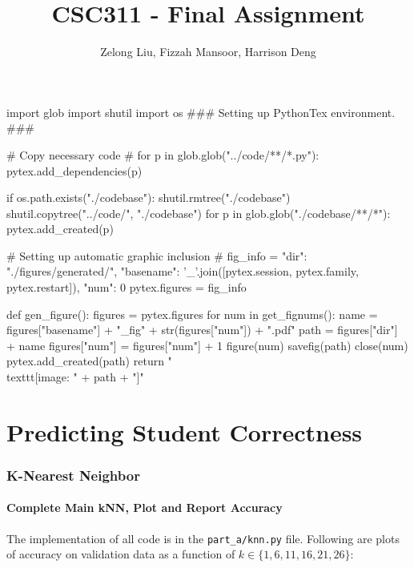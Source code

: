 \documentclass{article}
\title{CSC311 - Final Assignment}
\author{Zelong Liu, Fizzah Mansoor, Harrison Deng}
\begin{document}
    \begin{pylabcode}
        import glob
        import shutil
        import os
        ### Setting up PythonTex environment. ###

        # Copy necessary code #
        for p in glob.glob("../code/**/*.py"):
            pytex.add_dependencies(p)
        
        if os.path.exists("./codebase"):
            shutil.rmtree("./codebase")
        shutil.copytree("../code/", "./codebase")
        for p in glob.glob("./codebase/**/*"):
            pytex.add_created(p)

        # Setting up automatic graphic inclusion #
        fig_info = {
            "dir": "./figures/generated/",
            "basename": '_'.join([pytex.session, pytex.family, pytex.restart]),
            "num": 0
        }
        pytex.figures = fig_info

        def gen_figure():
            figures = pytex.figures
            for num in get_fignums():
                name = figures["basename"] + "_fig" + str(figures["num"]) + ".pdf"
                path = figures["dir"] + name
                figures["num"] = figures["num"] + 1
                figure(num)
                savefig(path)
                close(num)
                pytex.add_created(path)
            return "\\texttt{[image: " + path + "]}"
    \end{pylabcode}


    \maketitle

    \pagebreak

    \tableofcontents

    \pagebreak
    
    \part{Predicting Student Correctness}
    
    \section{K-Nearest Neighbor}
    \subsection{Complete Main kNN, Plot and Report Accuracy}
    The implementation of all code is in the \verb|part_a/knn.py| file. Following are plots of accuracy on validation data as a function of $k \in \{1,6,11,16,21,26\}$:
\end{document}
